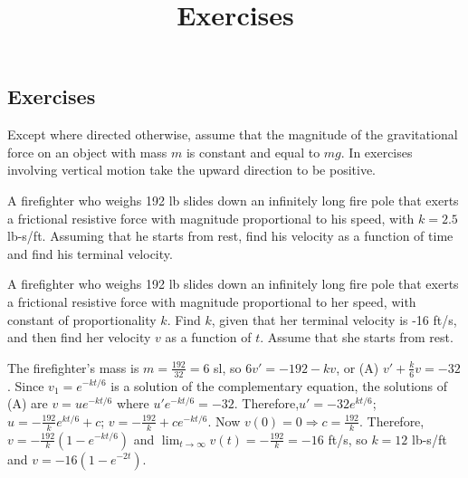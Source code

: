 \documentclass{ximera}
\title{Exercises} \license{CC BY-NC-SA 4.0}
\begin{document}
\begin{abstract}
\end{abstract}
\maketitle

\begin{onlineOnly}
\section*{Exercises}
\end{onlineOnly}


Except where directed otherwise, assume that the magnitude of the
gravitational force on an object with mass $m$ is constant and equal
to $mg$. In exercises involving vertical motion take the upward
direction to be positive.



\begin{problem}\label{exer:4.3.1}
A firefighter who weighs 192 lb slides down an infinitely long
fire pole
that exerts a frictional resistive force with magnitude proportional
to his speed, with $k=2.5$ lb-s/ft. Assuming that he starts from
rest, find his velocity as a function of time and find his terminal
velocity.
\end{problem}

\begin{problem}\label{exer:4.3.2}
A firefighter who weighs 192 lb slides down an infinitely long
fire pole
that exerts a frictional resistive force with magnitude proportional
to her speed, with constant of proportionality $k$. Find $k$, given
that her terminal velocity is -16 ft/s, and then find her velocity
$v$ as a function of $t$. Assume that she starts from rest.

\begin{solution}
The firefighter's mass is $m=\frac{192}{32}=6$ sl, so
 $6v'=-192-kv$, or (A) $v'+\frac{k}{6}v=-32$.
Since $v_1=e^{-kt/6}$ is a solution of the complementary equation,
the solutions of (A) are $v=ue^{-kt/6}$ where $u'e^{-kt/6}=-32$.
Therefore,$u'=-32e^{kt/6}$;\ $u=-\frac{192}{k}e^{kt/6}+c$;\;
$v=-\frac{192}{k}+ce^{-kt/6}$. Now $v(0)=0\Rightarrow
c=\frac{192}{k}$. Therefore,$v=-\frac{192}{k}(1-e^{-kt/6})$
and $\lim_{t\to\infty}v(t)=-\frac{192}{k}=-16$ ft/s, so $k=12$
lb-s/ft and $v=-16(1-e^{-2t})$.
\end{solution}
\end{problem}
\end{document}
